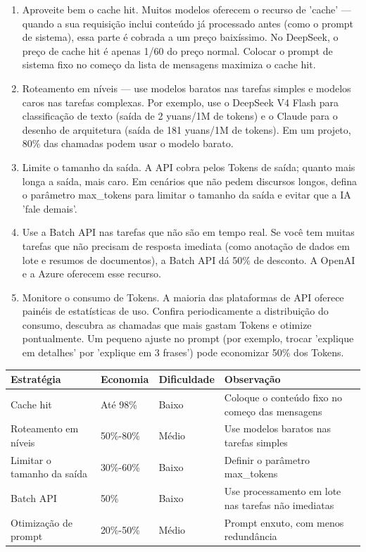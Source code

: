 \begin{enumerate}
  \item Aproveite bem o cache hit. Muitos modelos oferecem o recurso de 'cache' — quando a sua requisição inclui conteúdo já processado antes (como o prompt de sistema), essa parte é cobrada a um preço baixíssimo. No DeepSeek, o preço de cache hit é apenas 1/60 do preço normal. Colocar o prompt de sistema fixo no começo da lista de mensagens maximiza o cache hit.
  \item Roteamento em níveis — use modelos baratos nas tarefas simples e modelos caros nas tarefas complexas. Por exemplo, use o DeepSeek V4 Flash para classificação de texto (saída de 2 yuans/1M de tokens) e o Claude para o desenho de arquitetura (saída de 181 yuans/1M de tokens). Em um projeto, 80\% das chamadas podem usar o modelo barato.
  \item Limite o tamanho da saída. A API cobra pelos Tokens de saída; quanto mais longa a saída, mais caro. Em cenários que não pedem discursos longos, defina o parâmetro max\_tokens para limitar o tamanho da saída e evitar que a IA 'fale demais'.
  \item Use a Batch API nas tarefas que não são em tempo real. Se você tem muitas tarefas que não precisam de resposta imediata (como anotação de dados em lote e resumos de documentos), a Batch API dá 50\% de desconto. A OpenAI e a Azure oferecem esse recurso.
  \item Monitore o consumo de Tokens. A maioria das plataformas de API oferece painéis de estatísticas de uso. Confira periodicamente a distribuição do consumo, descubra as chamadas que mais gastam Tokens e otimize pontualmente. Um pequeno ajuste no prompt (por exemplo, trocar 'explique em detalhes' por 'explique em 3 frases') pode economizar 50\% dos Tokens.
\end{enumerate}

\begin{center}
\begin{tabularx}{\linewidth}{|X|X|X|X|}
\hline
\textbf{Estratégia} & \textbf{Economia} & \textbf{Dificuldade} & \textbf{Observação} \tabularnewline
\hline
Cache hit & Até 98\% & Baixo & Coloque o conteúdo fixo no começo das mensagens \tabularnewline
Roteamento em níveis & 50\%-80\% & Médio & Use modelos baratos nas tarefas simples \tabularnewline
Limitar o tamanho da saída & 30\%-60\% & Baixo & Definir o parâmetro max\_tokens \tabularnewline
Batch API & 50\% & Baixo & Use processamento em lote nas tarefas não imediatas \tabularnewline
Otimização de prompt & 20\%-50\% & Médio & Prompt enxuto, com menos redundância \tabularnewline
\hline
\end{tabularx}
\end{center}

